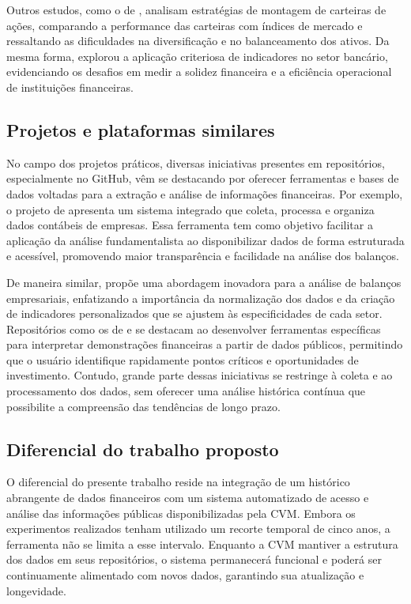 Outros estudos, como o de \citet{vieira:2019:montagem}, analisam estratégias de montagem de carteiras de ações, comparando a performance das carteiras com índices de mercado e ressaltando as dificuldades na diversificação e no balanceamento dos ativos. Da mesma forma, \citet{freitas:2020:analise} explorou a aplicação criteriosa de indicadores no setor bancário, evidenciando os desafios em medir a solidez financeira e a eficiência operacional de instituições financeiras.

\subsection{Projetos e plataformas similares}

No campo dos projetos práticos, diversas iniciativas presentes em repositórios, especialmente no GitHub, vêm se destacando por oferecer ferramentas e bases de dados voltadas para a extração e análise de informações financeiras. Por exemplo, o projeto de \citet{paiva:2025:projetoGitHub} apresenta um sistema integrado que coleta, processa e organiza dados contábeis de empresas. Essa ferramenta tem como objetivo facilitar a aplicação da análise fundamentalista ao disponibilizar dados de forma estruturada e acessível, promovendo maior transparência e facilidade na análise dos balanços.

De maneira similar, \citet{minas:2025:projetoGitHub} propõe uma abordagem inovadora para a análise de balanços empresariais, enfatizando a importância da normalização dos dados e da criação de indicadores personalizados que se ajustem às especificidades de cada setor. Repositórios como os de \citet{fontinele:2025:projetoGitHub} e \citet{louredo:2025:projetoGitHub} se destacam ao desenvolver ferramentas específicas para interpretar demonstrações financeiras a partir de dados públicos, permitindo que o usuário identifique rapidamente pontos críticos e oportunidades de investimento. Contudo, grande parte dessas iniciativas se restringe à coleta e ao processamento dos dados, sem oferecer uma análise histórica contínua que possibilite a compreensão das tendências de longo prazo.

\subsection{Diferencial do trabalho proposto}

O diferencial do presente trabalho reside na integração de um histórico abrangente de dados financeiros com um sistema automatizado de acesso e análise das informações públicas disponibilizadas pela CVM. Embora os experimentos realizados tenham utilizado um recorte temporal de cinco anos, a ferramenta não se limita a esse intervalo. Enquanto a CVM mantiver a estrutura dos dados em seus repositórios, o sistema permanecerá funcional e poderá ser continuamente alimentado com novos dados, garantindo sua atualização e longevidade.

